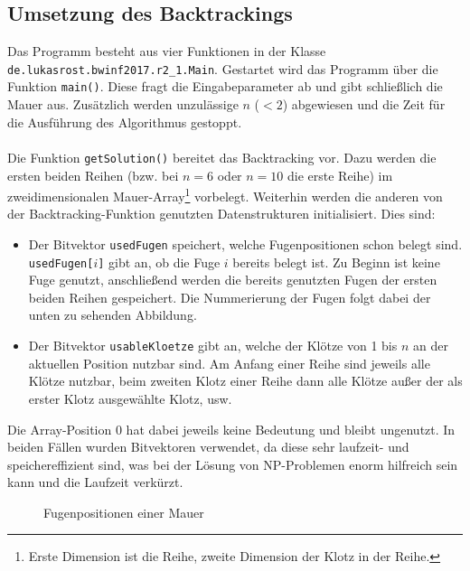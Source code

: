 \documentclass[a4paper, notitlepage, 12pt]{scrartcl}
\begin{document}
\subsection{Umsetzung des Backtrackings}
Das Programm besteht aus vier Funktionen in der Klasse \texttt{de.lukasrost.bwinf2017.r2\_1.Main}. Gestartet wird das Programm über die Funktion \texttt{main()}. Diese fragt die Eingabeparameter ab und gibt schließlich die Mauer aus. Zusätzlich werden unzulässige $n$ ($< 2$) abgewiesen und die Zeit für die Ausführung des Algorithmus gestoppt. \\ \\
Die Funktion \texttt{getSolution()} bereitet das Backtracking vor. Dazu werden die ersten beiden Reihen (bzw. bei $n = 6$ oder $n = 10$ die erste Reihe) im zweidimensionalen Mauer-Array\footnote{Erste Dimension ist die Reihe, zweite Dimension der Klotz in der Reihe.} vorbelegt. Weiterhin werden die anderen von der Backtracking-Funktion genutzten Datenstrukturen initialisiert. Dies sind: 
\begin{itemize}
\item Der Bitvektor \texttt{usedFugen} speichert, welche Fugenpositionen schon belegt sind. \texttt{usedFugen[$i$]} gibt an, ob die Fuge $i$ bereits belegt ist. Zu Beginn ist keine Fuge genutzt, anschließend werden die bereits genutzten Fugen der ersten beiden Reihen gespeichert. Die Nummerierung der Fugen folgt dabei der unten zu sehenden Abbildung.
\item Der Bitvektor \texttt{usableKloetze} gibt an, welche der Klötze von 1 bis $n$ an der aktuellen Position nutzbar sind. Am Anfang einer Reihe sind jeweils alle Klötze nutzbar, beim zweiten Klotz einer Reihe dann alle Klötze außer der als erster Klotz ausgewählte Klotz, usw.
\end{itemize}
Die Array-Position $0$ hat dabei jeweils keine Bedeutung und bleibt ungenutzt. In beiden Fällen wurden Bitvektoren verwendet, da diese sehr laufzeit- und speichereffizient sind, was bei der Lösung von NP-Problemen enorm hilfreich sein kann und die Laufzeit verkürzt. \\
\begin{figure}[H]
	\centering
	\caption{Fugenpositionen einer Mauer}
\end{figure}
\end{document}
